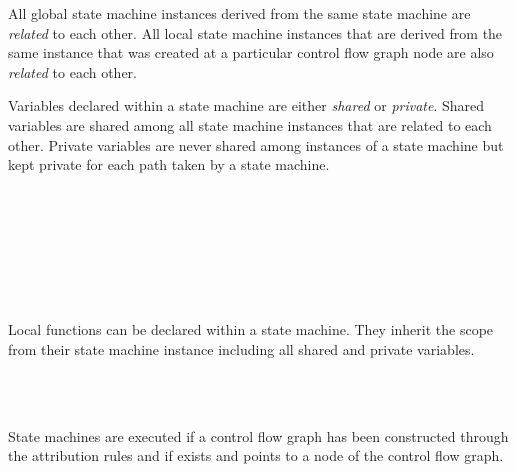 All global state machine instances derived from the same state machine are
\textit{related} to each other. All local
state machine instances that are derived from the same instance that was
created at a particular control flow graph node are also \textit{related}
to each other.

Variables declared within a state machine are
either \textit{shared} or
\textit{private}. Shared variables are shared
among all state machine instances that are related to each other.
Private variables are never shared among instances of a state machine
but kept private for each path taken by a state machine.

\begin{grammar}
      \produces {} \\
      \produces {} \\
      \produces {}
	  \\
      \produces {}   \\
      \produces {} 
	 \lextoken{=}  \\
      \produces {} 
	  \\
      \produces {} 
	  \lextoken{=} 
\end{grammar}

\noindent
Local functions can be declared within a state machine. They inherit
the scope from their state machine instance including all shared and
private variables.

\begin{grammar}
      \produces {} \\
      \produces {} \\
      \produces {}
\end{grammar}

\noindent
State machines are executed if a control flow graph has been constructed through the attribution rules and if
 exists and points to a node of the
control flow graph.

